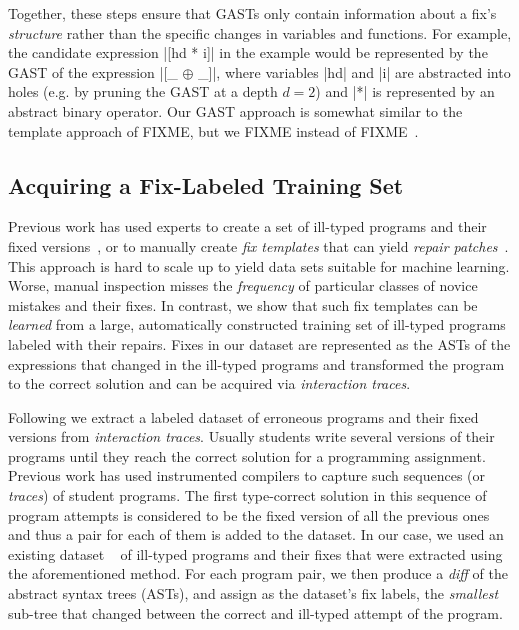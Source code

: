 Together, these steps ensure that GASTs only contain information about a fix's
\emph{structure} rather than the specific changes in variables and functions.
%
For example, the candidate expression |[hd * i]| in the \mbd example would be
represented by the GAST of the expression |[_ $\oplus$ _]|, where variables |hd|
and |i| are abstracted into holes (e.g. by pruning the GAST at a depth $d=2$)
and |*| is represented by an abstract binary operator. Our GAST approach
is somewhat similar to the template approach of FIXME, but we FIXME instead
of FIXME~\cite{FIXME}.


\subsection{Acquiring a Fix-Labeled Training Set}
\label{sec:overview:data}

Previous work has used experts to create a set of ill-typed programs and their
fixed versions~\citep[][]{Lerner2007-dt, Loncaric2016-uk}, or to manually create
\emph{fix templates} that can yield \emph{repair
patches}~\citep[][]{martinez2013automatically,martinez2015mining}.
%
This approach is hard to scale up to yield data sets suitable for machine
learning. Worse, manual inspection misses the \emph{frequency} of particular
classes of novice mistakes and their fixes.
%
In contrast, we show that such fix templates can be \emph{learned} from a large,
automatically constructed training set of ill-typed programs labeled with their
repairs.
%
Fixes in our dataset are represented as the ASTs of the expressions that changed
in the ill-typed programs and transformed the program to the correct solution
and can be acquired via \emph{interaction traces}.

Following \citep{Seidel:2017} we extract a labeled dataset of erroneous programs
and their fixed versions from \emph{interaction traces}. Usually students write
several versions of their programs until they reach the correct solution for a
programming assignment. Previous work has used instrumented compilers to capture
such sequences (or \emph{traces}) of student programs. The first type-correct
solution in this sequence of program attempts is considered to be the fixed
version of all the previous ones and thus a pair for each of them is added to
the dataset. In our case, we used an existing dataset
~\citep[][]{yunounderstand, Seidel:2017} of ill-typed \ocaml programs
and their
fixes that were extracted using the aforementioned method. For each program
pair, we then produce a \emph{diff} of the abstract syntax trees (ASTs), and
assign as the dataset's fix labels, the \emph{smallest} sub-tree that changed
between the correct and ill-typed attempt of the program.


